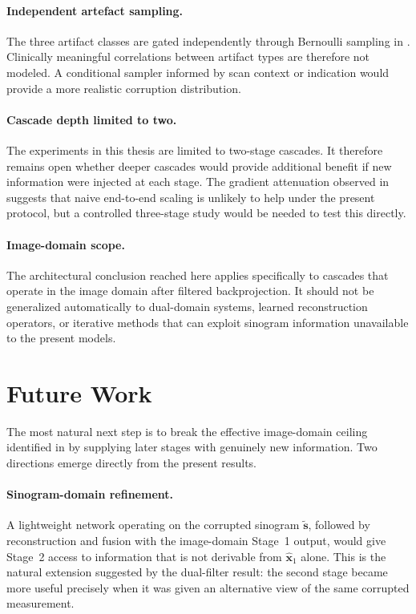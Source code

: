 \paragraph{Independent artefact sampling.}
The three artifact classes are gated independently through Bernoulli sampling in . Clinically meaningful correlations between artifact types are therefore not modeled. A conditional sampler informed by scan context or indication would provide a more realistic corruption distribution.

\paragraph{Cascade depth limited to two.}
The experiments in this thesis are limited to two-stage cascades. It therefore remains open whether deeper cascades would provide additional benefit if new information were injected at each stage. The gradient attenuation observed in  suggests that naive end-to-end scaling is unlikely to help under the present protocol, but a controlled three-stage study would be needed to test this directly.

\paragraph{Image-domain scope.}
The architectural conclusion reached here applies specifically to cascades that operate in the image domain after filtered backprojection. It should not be generalized automatically to dual-domain systems, learned reconstruction operators, or iterative methods that can exploit sinogram information unavailable to the present models.

\section{Future Work}
\label{sec:conc_future}

The most natural next step is to break the effective image-domain ceiling identified in  by supplying later stages with genuinely new information. Two directions emerge directly from the present results.

\paragraph{Sinogram-domain refinement.}
A lightweight network operating on the corrupted sinogram $\tilde{\mathbf{s}}$, followed by reconstruction and fusion with the image-domain Stage~1 output, would give Stage~2 access to information that is not derivable from $\hat{\mathbf{x}}_1$ alone. This is the natural extension suggested by the dual-filter result: the second stage became more useful precisely when it was given an alternative view of the same corrupted measurement.


